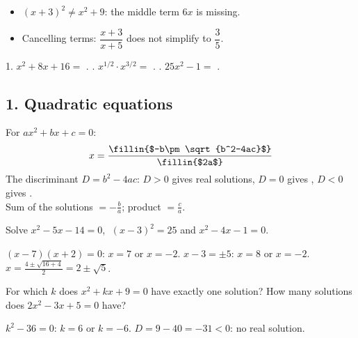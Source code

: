 \begin{mistakes}
\begin{itemize}
\item $(x+3)^2\neq x^2+9$: the middle term $6x$ is missing.
\item Cancelling terms: $\dfrac{x+3}{x+5}$ does not simplify to $\dfrac35$.
\end{itemize}
\end{mistakes}

\begin{quickcheck}
1. $x^2+8x+16=$ . . $x^{1/2}\cdot x^{3/2}=$ . . $25x^2-1=$ .
\end{quickcheck}


\subsection*{1. Quadratic equations}
\begin{keyidea}
For $ax^2+bx+c=0$: \[x=\frac{\fillin{$-b\pm\sqrt{b^2-4ac}$}}{\fillin{$2a$}}\]
The discriminant $D=b^2-4ac$: $D>0$ gives  real solutions, $D=0$ gives , $D<0$ gives .\\
Sum of the solutions $=-\frac ba$; product $=\frac ca$.
\end{keyidea}

Solve $x^2-5x-14=0$, $\;(x-3)^2=25$ and $x^2-4x-1=0$.
\begin{workspace}[2.6cm]
$(x-7)(x+2)=0$: $x=7$ or $x=-2$. \quad $x-3=\pm5$: $x=8$ or $x=-2$. \quad $x=\frac{4\pm\sqrt{16+4}}{2}=2\pm\sqrt5$.
\end{workspace}

For which $k$ does $x^2+kx+9=0$ have exactly one solution? How many solutions does $2x^2-3x+5=0$ have?
\begin{workspace}[2.2cm]
$k^2-36=0$: $k=6$ or $k=-6$. \quad $D=9-40=-31<0$: no real solution.
\end{workspace}

